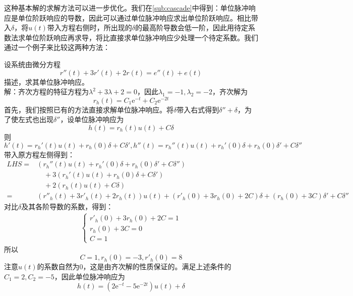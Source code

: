 这种基本解的求解方法可以进一步优化。我们在\ref{sub:cascade}中得到：单位脉冲响应是单位阶跃响应的导数，因此可以通过单位脉冲响应求出单位阶跃响应。相比带入$\delta$，将$u(t)$带入方程右侧时，所出现的$\delta$的最高阶导数会低一阶，因此用待定系数法求单位阶跃响应再求导，将比直接求单位脉冲响应少处理一个待定系数。我们通过一个例子来比较这两种方法：
\begin{example}
    设系统由微分方程\[r''(t)+3r'(t)+2r(t)=e''(t)+e(t)\]描述，求其单位脉冲响应。\\
    解：齐次方程的特征方程为$\lambda^2+3\lambda+2=0$，因此$\lambda_1=-1,\lambda_2=-2$，齐次解为$$r_h(t)=C_1 \mathrm{e}^{-t}+C_2 \mathrm{e}^{-2t}$$
    首先，我们按照已有的方法直接求解单位脉冲响应。将$\delta$带入右式得到$\delta''+\delta$，为了使左式也出现$\delta''$，设单位脉冲响应为$$h(t)=r_h(t)u(t)+C\delta$$
    则$$h'(t)=r_h'(t)u(t)+r_h(0)\delta+C\delta',h''(t)=r_h''(t)u(t)+r_h'(0)\delta+r_h(0)\delta'+C\delta''$$
    带入原方程左侧得到：\begin{align*}
        LHS=&\left(r_h''(t)u(t)+r_h'(0)\delta+r_h(0)\delta'+C\delta''\right)\\
        &\quad+3\left(r_h'(t)u(t)+r_h(0)\delta+C\delta'\right)\\
        &\quad+2\left(r_h(t)u(t)+C\delta\right)\\
        =&\left(r''_h(t)+3r'_h(t)+2r_h(t)\right)u(t)+\left(r'_h(0)+3r_h(0)+2C\right)\delta+\left(r_h(0)+3C\right)\delta'+C\delta''
    \end{align*}
    对比$\delta$及其各阶导数的系数，得到：\begin{align*}
        \begin{cases}
            r'_h(0)+3r_h(0)+2C=1\\
            r_h(0)+3C=0\\
            C=1
        \end{cases}
    \end{align*}
    所以$$C=1,r_h(0)=-3,r'_h(0)=8$$
    注意$u(t)$的系数自然为0，这是由齐次解的性质保证的。满足上述条件的$C_1=2,C_2=-5$，因此单位脉冲响应为
    $$h(t)=\left(2\mathrm{e}^{-t}-5\mathrm{e}^{-2t}\right)u(t)+\delta$$


\end{example}
